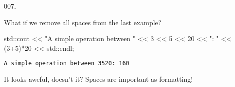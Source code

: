 \documentclass[]{book}
\newenvironment{Shaded}{}{}
\newcommand{\BuiltInTok}[1]{#1}
\newcommand{\DecValTok}[1]{\textcolor[rgb]{0.25,0.63,0.44}{#1}}
\newcommand{\NormalTok}[1]{#1}
\newcommand{\StringTok}[1]{\textcolor[rgb]{0.25,0.44,0.63}{#1}}
\begin{document}
\vspace{2mm}\noindent\hrulefill{}

\begin{minipage}{\linewidth}\noindent
{\tiny 007.}\\
\begin{minipage}[t]{.485\linewidth}

What if we remove all spaces from the last example?

\begin{framed}

\begin{Shaded}
\begin{Highlighting}[]
\BuiltInTok{std::}\NormalTok{cout}
\NormalTok{  << }\StringTok{"A simple operation between "}\NormalTok{ << }\DecValTok{3}
\NormalTok{  << }\DecValTok{5}\NormalTok{ << }\DecValTok{20}\NormalTok{ << }\StringTok{": "}
\NormalTok{  << (}\DecValTok{3+5}\NormalTok{)*}\DecValTok{20}\NormalTok{ << }\BuiltInTok{std::}\NormalTok{endl;}
\end{Highlighting}
\end{Shaded}

\end{framed}

\end{minipage}
\hfill
\begin{minipage}[t]{.485\linewidth}

\begin{framed}

\begin{verbatim}
A simple operation between 3520: 160
\end{verbatim}

\end{framed}

It looks aweful, doesn't it? Spaces are important as formatting!

\end{minipage}
\end{minipage}

\vspace{2mm}\noindent\hrulefill{}
\end{document}
